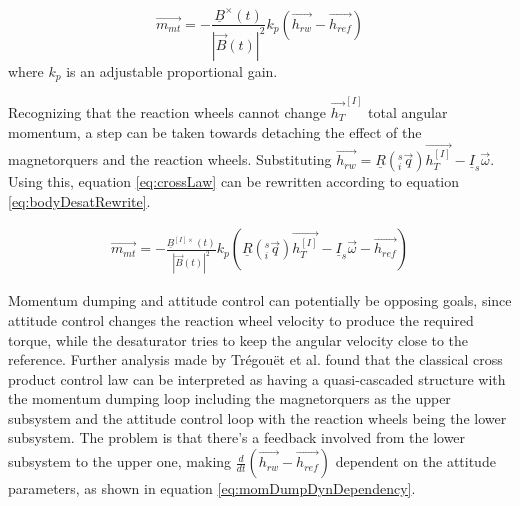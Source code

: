 \begin{equation}
\label{eq:crossLaw}
\vec{m_{mt}} = -\frac{\underline{B}^\times(t)}{|\vec{B}(t) |^2} k_p\left(\vec{h_{rw}} - \vec{h_{ref}} \right)
\end{equation}
where $k_p$ is an adjustable proportional gain.

		
Recognizing that the reaction wheels cannot change $\vec{h_{T}}^{[I]}$ total angular momentum, a step can be taken towards detaching the effect of the magnetorquers and the reaction wheels. Substituting $ \vec{h_{rw}} = \underline{R}(^s_i\vec{ q}) \vec{h_{T}^{[I]}} - \underline{I}_s \vec{\omega}$. Using this, equation \ref{eq:crossLaw} can be rewritten according to equation \ref{eq:bodyDesatRewrite}.

\begin{align}
\vec{m_{mt}} = 
-  \frac{\underline{B}^{[I]\times}(t)}{|\vec{B}(t) |^2} k_p\left(\underline{R}(^s_i\vec{ q}) \vec{h_{T}^{[I]}} -  \underline{I}_s \vec{\omega} - \vec{h_{ref}}\right) 
\label{eq:bodyDesatRewrite}
\end{align}		


			
Momentum dumping and attitude control can potentially be opposing goals, since attitude control changes the reaction wheel velocity to produce the required torque, while the desaturator tries to keep the angular velocity close to the reference. 
Further analysis made by Trégouët et al. \cite{DesatTregouet} found that the classical cross product control law can be interpreted as having a quasi-cascaded structure with the momentum dumping loop including the magnetorquers as the upper subsystem and the attitude control loop with the reaction wheels being the lower subsystem. The problem is that there's a feedback involved from the lower subsystem to the upper one, making $\frac{d}{dt}(\vec{h_{rw}} - \vec{h_{ref}})$ dependent on the attitude parameters, as shown in equation \ref{eq:momDumpDynDependency}.  

